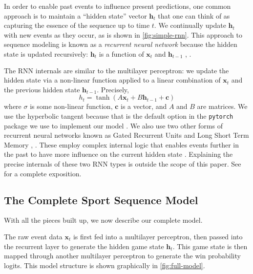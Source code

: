 In order to enable past events to influence present predictions, one common approach is to maintain a ``hidden state'' vector $\mathbf h_t$ that one can think of as capturing the essence of the sequence up to time $t$. We continually update $\mathbf h_t$ with new events as they occur, as is shown in \autoref{fig:simple-rnn}.
This approach to sequence modeling is known as a \emph{recurrent neural network} because the hidden state is updated recursively: $\mathbf h_t$ is a function of $\mathbf x_t$ and $\mathbf h_{t-1}$ \cite[\S 10.5]{ISL}, \cite[\S 15]{PML}.

The RNN internals are similar to the multilayer perceptron: we update the hidden state via a non-linear function applied to a linear combination of $\mathbf x_t$ and the previous hidden state $\mathbf h_{t-1}$. Precisely,
\begin{equation}
	\label{eqn:elman-rnn}
	h_t = \tanh (A \mathbf x_t + B \mathbf h_{t-1} + \mathbf c)
\end{equation}
where $\sigma$ is some non-linear function, $\mathbf c$ is a vector, and $A$ and $B$ are matrices. We use the hyperbolic tangent because that is the default option in the \texttt{pytorch} package we use to implement our model \cite{pytorch}. We also use two other forms of recurrent neural networks known as Gated Recurrent Units \cite[\S 15.2.7.1]{PML} and Long Short Term Memory \cite[\S 10.5.1]{ISL}, \cite[\S 15.2.7.2]{PML}. These employ complex internal logic that enables events further in the past to have more influence on the current hidden state \cite[\S 15.2.6]{PML}. Explaining the precise internals of these two RNN types is outside the scope of this paper. See \textcite[\S 15.2.7]{PML} for a complete exposition.

\subsection{The Complete Sport Sequence Model}
\label{sec:complete-model}

With all the pieces built up, we now describe our complete model.

The raw event data $\mathbf x_t$ is first fed into a multilayer perceptron, then passed into the recurrent layer to generate the hidden game state $\mathbf h_t$. This game state is then mapped through another multilayer perceptron to generate the win probability logits. This model structure is shown graphically in \autoref{fig:full-model}.

